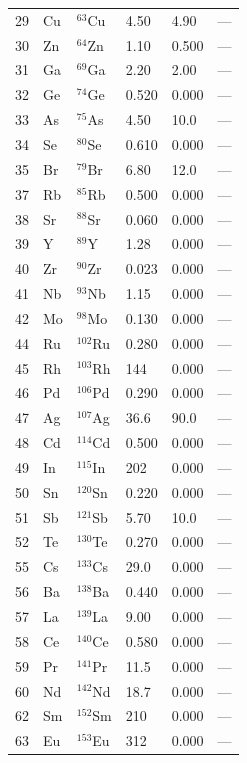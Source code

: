 \documentclass[12pt,a4paper]{article}
\begin{document}
\begin{longtable}{p{0.8cm}p{1.2cm}p{2.0cm}p{2.5cm}p{2.5cm}p{2.5cm}}
		29 & Cu & \(^{63}\)Cu & 4.50 & 4.90 & --- \\
		30 & Zn & \(^{64}\)Zn & 1.10 & 0.500 & --- \\
		31 & Ga & \(^{69}\)Ga & 2.20 & 2.00 & --- \\
		32 & Ge & \(^{74}\)Ge & 0.520 & 0.000 & --- \\
		33 & As & \(^{75}\)As & 4.50 & 10.0 & --- \\
		34 & Se & \(^{80}\)Se & 0.610 & 0.000 & --- \\
		35 & Br & \(^{79}\)Br & 6.80 & 12.0 & --- \\
		37 & Rb & \(^{85}\)Rb & 0.500 & 0.000 & --- \\
		38 & Sr & \(^{88}\)Sr & 0.060 & 0.000 & --- \\
		39 & Y  & \(^{89}\)Y & 1.28 & 0.000 & --- \\
		40 & Zr & \(^{90}\)Zr & 0.023 & 0.000 & --- \\
		41 & Nb & \(^{93}\)Nb & 1.15 & 0.000 & --- \\
		42 & Mo & \(^{98}\)Mo & 0.130 & 0.000 & --- \\
		44 & Ru & \(^{102}\)Ru & 0.280 & 0.000 & --- \\
		45 & Rh & \(^{103}\)Rh & 144 & 0.000 & --- \\
		46 & Pd & \(^{106}\)Pd & 0.290 & 0.000 & --- \\
		47 & Ag & \(^{107}\)Ag & 36.6 & 90.0 & --- \\
		48 & Cd & \(^{114}\)Cd & 0.500 & 0.000 & --- \\
		49 & In & \(^{115}\)In & 202 & 0.000 & --- \\
		50 & Sn & \(^{120}\)Sn & 0.220 & 0.000 & --- \\
		51 & Sb & \(^{121}\)Sb & 5.70 & 10.0 & --- \\
		52 & Te & \(^{130}\)Te & 0.270 & 0.000 & --- \\
		55 & Cs & \(^{133}\)Cs & 29.0 & 0.000 & --- \\
		56 & Ba & \(^{138}\)Ba & 0.440 & 0.000 & --- \\
		57 & La & \(^{139}\)La & 9.00 & 0.000 & --- \\
		58 & Ce & \(^{140}\)Ce & 0.580 & 0.000 & --- \\
		59 & Pr & \(^{141}\)Pr & 11.5 & 0.000 & --- \\
		60 & Nd & \(^{142}\)Nd & 18.7 & 0.000 & --- \\
		62 & Sm & \(^{152}\)Sm & 210 & 0.000 & --- \\
		63 & Eu & \(^{153}\)Eu & 312 & 0.000 & --- \\

\end{longtable}
\end{document}
